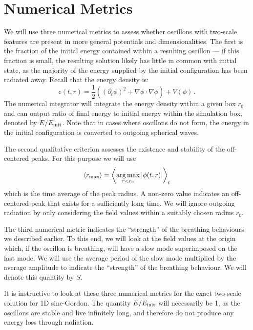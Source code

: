 \documentclass[11pt]{book}
\DeclareMathOperator*{\argmax}{arg\,max}
\begin{document}
\section{Numerical Metrics}\label{numerical}
We will use three numerical metrics to assess whether oscillons with two-scale features are present in more general potentials and dimensionalities.  The first is the fraction of the initial energy contained within a resulting oscillon --- if this fraction is small,  the resulting solution likely has little in common with initial state, as the majority of the energy supplied by the initial configuration has  been radiated away. Recall that the energy density is:
\begin{equation}
  e(t,r) = \frac{1}{2}\left(\left(\partial_t\phi\right)^2+ \nabla \phi\cdot \nabla \phi \right) + V(\phi) \, .
\end{equation}
The numerical integrator will integrate the energy density within a given box $r_0$ and can output ratio of final energy to initial energy within the simulation box, denoted by $E/E_{\rm init}$. Note that in cases where oscillons do not form, the energy in the initial configuration is converted to outgoing spherical waves.

The second qualitative criterion assesses the existence and stability of the off-centered peaks. For this purpose we will use
\begin{equation}
  \langle r_{\rm max} \rangle  = \left\langle \argmax_{r < r_0} |\phi(t,r)| \right\rangle_t
\end{equation}
which is the time average of the peak radius. A non-zero value indicates an off-centered peak that exists for a sufficiently long time. We will ignore outgoing radiation by only considering the field values within a suitably chosen radius $r_0$.

The third numerical metric indicates the ``strength'' of the breathing behaviours we described earlier. To this end, we will look at the field values at the origin which, if the oscillon is breathing, will have a slow mode superimposed on the fast mode. We will use the average period of the slow mode multiplied by the average amplitude to indicate the ``strength'' of the breathing behaviour. We will denote this quantity by $S$.

It is instructive to look at these three numerical metrics for the exact two-scale solution for 1D sine-Gordon. The quantity $E/E_{\rm init}$ will necessarily be 1, as the oscillons are stable and live infinitely long, and therefore do not produce any energy loss through radiation.
\end{document}
